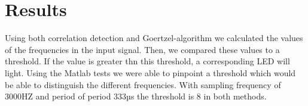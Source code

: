 \section{Results}
Using both correlation detection and Goertzel-algorithm we calculated the values of the frequencies in the input signal. Then, we compared these values to a threshold. If the value is greater thn this threshold, a corresponding LED will light. Using the Matlab tests we were able to pinpoint a threshold which would be able to distinguish the different frequencies. With sampling frequency of 3000HZ and period of period 333µs the threshold is 8 in both methods.